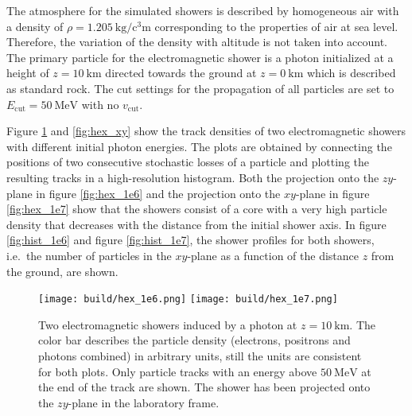 The atmosphere for the simulated showers is described by homogeneous air with a density of $\rho = \SI{1.205}{\kilo\gram\per\cubic\centi\metre}$ corresponding to the properties of air at sea level.
Therefore, the variation of the density with altitude is not taken into account.
The primary particle for the electromagnetic shower is a photon initialized at a height of $z = \SI{10}{\kilo\metre}$ directed towards the ground at $z=\SI{0}{\kilo\metre}$ which is described as standard rock.
The cut settings for the propagation of all particles are set to $E_{\text{cut}} = \SI{50}{\mega\electronvolt}$ with no $v_{\text{cut}}$.

Figure \ref{fig:hex} and \ref{fig:hex_xy} show the track densities of two electromagnetic showers with different initial photon energies.
The plots are obtained by connecting the positions of two consecutive stochastic losses of a particle and plotting the resulting tracks in a high-resolution histogram.
Both the projection onto the $zy$-plane in figure \ref{fig:hex_1e6} and the projection onto the $xy$-plane in figure \ref{fig:hex_1e7} show that the showers consist of a core with a very high particle density that decreases with the distance from the initial shower axis.
In figure \ref{fig:hist_1e6} and figure \ref{fig:hist_1e7}, the shower profiles for both showers, i.e.\ the number of particles in the $xy$-plane as a function of the distance $z$ from the ground, are shown.

\begin{figure}
      \centering
        {\texttt{[image: build/hex\_1e6.png]}}
        \hfill
        {\texttt{[image: build/hex\_1e7.png]}}
      \caption{Two electromagnetic showers induced by a photon at $z=\SI{10}{\kilo\metre}$. The color bar describes the particle density (electrons, positrons and photons combined) in arbitrary units, still the units are consistent for both plots. Only particle tracks with an energy above $\SI{50}{\mega\electronvolt}$ at the end of the track are shown. The shower has been projected onto the $zy$-plane in the laboratory frame.\label{fig:hex}}
\end{figure}

